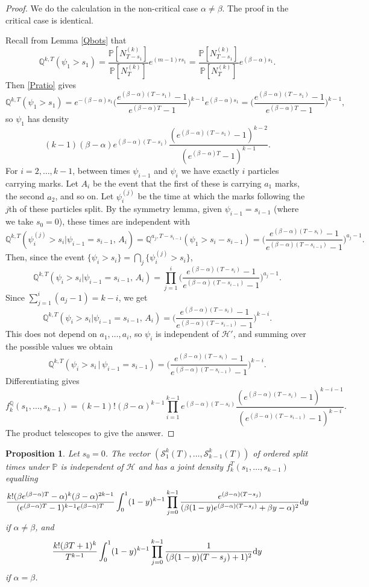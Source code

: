 \documentclass{article}
\theoremstyle{plain}
\newtheorem{prop}[thm]{Proposition}
\theoremstyle{definition}
\newcommand{\Q}{\mathbb{Q}}
\renewcommand{\P}{\mathbb{P}}
\renewcommand{\d}{{\rm{d}}}
\renewcommand{\S}{\mathcal{S}}
\begin{document}
\begin{proof}
We do the calculation in the non-critical case $\alpha\neq \beta$. The proof in the critical case is identical.

Recall from Lemma \ref{Qbots} that
\[\Q^{k,T}(\psi_1 > s_1) = \frac{\P[N_{T-s_1}^{(k)}]}{\P[N_{T}^{(k)}]}e^{(m-1)rs_1} = \frac{\P[N_{T-s_1}^{(k)}]}{\P[N_{T}^{(k)}]}e^{(\beta-\alpha)s_1}.\]
Then \eqref{Pratio} gives
\[\Q^{k,T}(\psi_1 > s_1) = e^{-(\beta-\alpha)s_1}\Big(\frac{e^{(\beta-\alpha)(T-s_1)}-1}{e^{(\beta-\alpha)T}-1}\Big)^{k-1}e^{(\beta-\alpha)s_1} = \Big(\frac{e^{(\beta-\alpha)(T-s_1)}-1}{e^{(\beta-\alpha)T}-1}\Big)^{k-1},\]
so $\psi_1$ has density
\[(k-1)(\beta-\alpha)e^{(\beta-\alpha)(T-s_1)}\frac{(e^{(\beta-\alpha)(T-s_1)}-1)^{k-2}}{(e^{(\beta-\alpha)T}-1)^{k-1}}.\]
For $i=2,\ldots, k-1$, between times $\psi_{i-1}$ and $\psi_i$ we have exactly $i$ particles carrying marks. Let $A_i$ be the event that the first of these is carrying $a_1$ marks, the second $a_2$, and so on. Let $\psi^{(j)}_i$ be the time at which the marks following the $j$th of these particles split. By the symmetry lemma, given $\psi_{i-1} = s_{i-1}$ (where we take $s_0=0$), these times are independent with
\[\Q^{k,T}(\psi^{(j)}_i > s_i | \psi_{i-1} = s_{i-1},\, A_i) = \Q^{a_j,T-s_{i-1}}(\psi_1 > s_i-s_{i-1}) = \Big(\frac{e^{(\beta-\alpha)(T-s_i)}-1}{e^{(\beta-\alpha)(T-s_{i-1})}-1}\Big)^{a_j-1}.\]
Then, since the event $\{\psi_i > s_i\} = \bigcap_{j}\{\psi_i^{(j)} > s_i\}$,
\[\Q^{k,T}(\psi_i > s_i | \psi_{i-1} = s_{i-1},\, A_i) = \prod_{j=1}^i \Big(\frac{e^{(\beta-\alpha)(T-s_i)}-1}{e^{(\beta-\alpha)(T-s_{i-1})}-1}\Big)^{a_j-1}.\]
Since $\sum_{j=1}^i (a_j-1) = k-i$, we get
\[\Q^{k,T}(\psi_i > s_i | \psi_{i-1} = s_{i-1},\, A_i) = \Big(\frac{e^{(\beta-\alpha)(T-s_i)}-1}{e^{(\beta-\alpha)(T-s_{i-1})}-1}\Big)^{k-i}.\]
This does not depend on $a_1,\ldots, a_i$, so $\psi_i$ is independent of $\mathcal H'$, and summing over the possible values we obtain
\[\Q^{k,T}(\psi_i > s_i \, |\, \psi_{i-1} = s_{i-1}) = \Big(\frac{e^{(\beta-\alpha)(T-s_i)}-1}{e^{(\beta-\alpha)(T-s_{i-1})}-1}\Big)^{k-i}.\]
Differentiating gives
\[f^\Q_k(s_1,\ldots,s_{k-1}) = (k-1)! (\beta-\alpha)^{k-1} \prod_{i=1}^{k-1} e^{(\beta-\alpha)(T-s_i)}\frac{(e^{(\beta-\alpha)(T-s_i)}-1)^{k-i-1}}{(e^{(\beta-\alpha)(T-s_{i-1})}-1)^{k-i}}.\]
The product telescopes to give the answer.
\end{proof}

\begin{prop}\label{BDdensity}
Let $s_0=0$. The vector $(\S^k_1(T),\ldots,\S^k_{k-1}(T))$ of ordered split times under $\P$ is independent of $\mathcal H$ and has a joint density $f_k^T(s_1,\ldots, s_{k-1})$ equalling
\[\frac{k!(\beta e^{(\beta-\alpha)T}-\alpha)^k (\beta-\alpha)^{2k-1}}{(e^{(\beta-\alpha)T}-1)^{k-1} e^{(\beta-\alpha)T}} \int_0^1 (1-y)^{k-1} \prod_{j=0}^{k-1} \frac{e^{(\beta-\alpha)(T-s_j)}}{(\beta(1-y)e^{(\beta-\alpha)(T-s_j)} + \beta y - \alpha)^2} \d y\]
if $\alpha\neq\beta$, and
\[\frac{k!(\beta T+1)^k}{T^{k-1}} \int_0^1 (1-y)^{k-1} \prod_{j=0}^{k-1} \frac{1}{(\beta(1-y)(T-s_j) + 1)^2} \d y\]
if $\alpha=\beta$.
\end{prop}
\end{document}

